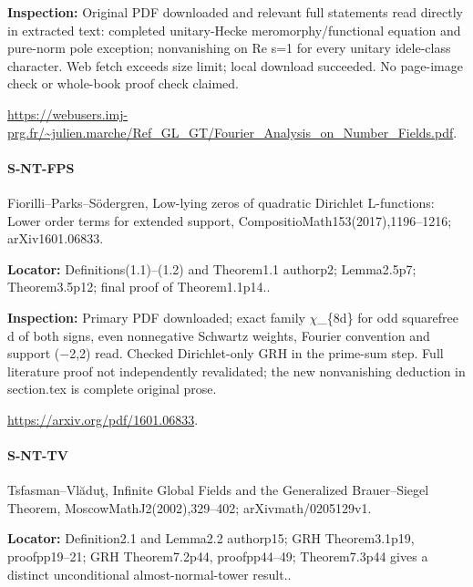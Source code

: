 \documentclass[11pt,a4paper]{article}
\begin{document}
\textbf{Inspection:} Original PDF downloaded and relevant full statements read directly in extracted text:\allowbreak{} completed unitary-Hecke meromorphy/\allowbreak{}functional equation and pure-norm pole exception; nonvanishing on Re s=1 for every unitary idele-class character.\allowbreak{} Web fetch exceeds size limit; local download succeeded.\allowbreak{} No page-image check or whole-book proof check claimed.\allowbreak{}

\url{https://webusers.imj-prg.fr/~julien.marche/Ref_GL_GT/Fourier_Analysis_on_Number_Fields.pdf}.

\paragraph{S-NT-FPS} Fiorilli–\allowbreak{}Parks–\allowbreak{}Södergren, Low-lying zeros of quadratic Dirichlet L-functions:\allowbreak{} Lower order terms for extended support, CompositioMath153(2017),1196–\allowbreak{}1216; arXiv1601.\allowbreak{}06833.

\textbf{Locator:} Definitions(1.\allowbreak{}1)–\allowbreak{}(1.\allowbreak{}2) and Theorem1.\allowbreak{}1 authorp2; Lemma2.\allowbreak{}5p7; Theorem3.\allowbreak{}5p12; final proof of Theorem1.\allowbreak{}1p14.\allowbreak{}.

\textbf{Inspection:} Primary PDF downloaded; exact family \ensuremath{\chi}\_\allowbreak{}\{8d\} for odd squarefree d of both signs, even nonnegative Schwartz weights, Fourier convention and support (\ensuremath{-}2,2) read.\allowbreak{} Checked Dirichlet-only GRH in the prime-sum step.\allowbreak{} Full literature proof not independently revalidated; the new nonvanishing deduction in section.\allowbreak{}tex is complete original prose.\allowbreak{}

\url{https://arxiv.org/pdf/1601.06833}.

\paragraph{S-NT-TV} Tsfasman–\allowbreak{}Vlăduţ, Infinite Global Fields and the Generalized Brauer–\allowbreak{}Siegel Theorem, MoscowMathJ2(2002),329–\allowbreak{}402; arXivmath/\allowbreak{}0205129v1.

\textbf{Locator:} Definition2.\allowbreak{}1 and Lemma2.\allowbreak{}2 authorp15; GRH Theorem3.\allowbreak{}1p19, proofpp19–\allowbreak{}21; GRH Theorem7.\allowbreak{}2p44, proofpp44–\allowbreak{}49; Theorem7.\allowbreak{}3p44 gives a distinct unconditional almost-normal-tower result.\allowbreak{}.
\end{document}
